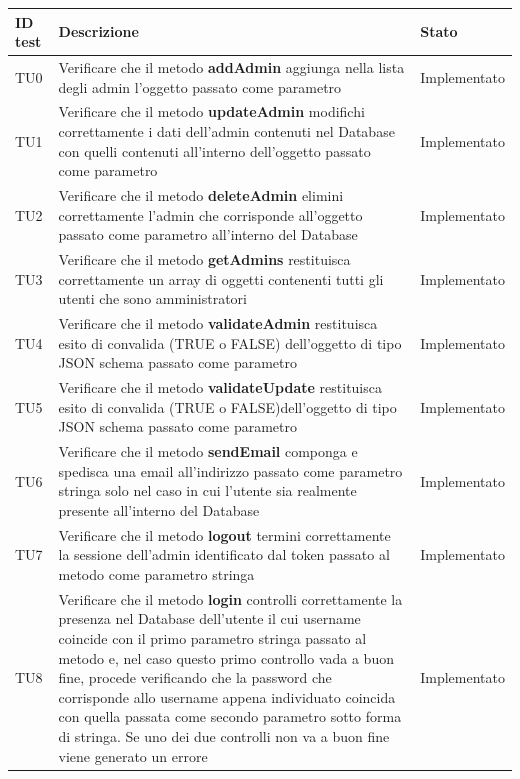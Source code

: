 \documentclass[../PianoDiQualifica_v4.0.0.tex]{subfiles}
\begin{document}
	\begin{longtable}[c] { >{\centering\arraybackslash}p{2cm} p{9cm} >{\centering\arraybackslash}p{4cm}}
		\toprule
		\centerline{\textbf{ID test}} & \centerline{\textbf{Descrizione}} & \centerline{\textbf{Stato}} \\
			\midrule
			TU0 & Verificare che il metodo \textbf{addAdmin} aggiunga nella lista degli admin l'oggetto passato come parametro & Implementato \\
			\addlinespace[0.3em]
			\midrule
			\addlinespace[0.3em]
			TU1 & Verificare che il metodo \textbf{updateAdmin} modifichi correttamente i dati dell'admin contenuti nel Database con quelli contenuti all'interno dell'oggetto passato come parametro & Implementato \\
			\addlinespace[0.3em]
			\midrule
			\addlinespace[0.3em]
			TU2 & Verificare che il metodo \textbf{deleteAdmin} elimini correttamente l'admin che corrisponde all'oggetto passato come parametro all'interno del Database & Implementato \\
			\addlinespace[0.3em]
			\midrule
			\addlinespace[0.3em]
			TU3 & Verificare che il metodo \textbf{getAdmins} restituisca correttamente un array di oggetti contenenti tutti gli utenti che sono amministratori & Implementato \\
			\addlinespace[0.3em]
			\midrule
			\addlinespace[0.3em]
			TU4 & Verificare che il metodo \textbf{validateAdmin} restituisca esito di convalida (TRUE o FALSE) dell'oggetto di tipo JSON schema passato come parametro & Implementato \\
			\addlinespace[0.3em]
			\midrule
			\addlinespace[0.3em]
			TU5 & Verificare che il metodo \textbf{validateUpdate} restituisca esito di convalida (TRUE o FALSE)dell'oggetto di tipo JSON schema passato come parametro & Implementato \\
			\addlinespace[0.3em]
			\midrule
			\addlinespace[0.3em]
			TU6 & Verificare che il metodo \textbf{sendEmail} componga e spedisca una email all'indirizzo passato come parametro stringa solo nel caso in cui l'utente sia realmente presente all'interno del Database & Implementato \\
			\addlinespace[0.3em]
			\midrule
			\addlinespace[0.3em]
			TU7 & Verificare che il metodo \textbf{logout} termini correttamente la sessione dell'admin identificato dal token passato al metodo come parametro stringa & Implementato \\
			\addlinespace[0.3em]
			\midrule
			\addlinespace[0.3em]
			TU8 & Verificare che il metodo \textbf{login} controlli correttamente la presenza nel Database dell'utente il cui username coincide con il primo parametro stringa passato al metodo e, nel caso questo primo controllo vada a buon fine, procede verificando che la password che corrisponde allo username appena individuato coincida con quella passata come secondo parametro sotto forma di stringa. Se uno dei due controlli non va a buon fine viene generato un errore & Implementato \\

\end{longtable}
\end{document}
